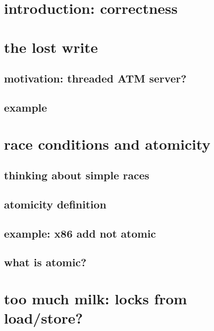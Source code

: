 
\section{introduction: correctness}



\section{the lost write}

\subsection{motivation: threaded ATM server?}


\subsection{example}


\section{race conditions and atomicity}
\subsection{thinking about simple races} 


\subsection{atomicity definition}



\subsection{example: x86 add not atomic}



\subsection{what is atomic?}



\section{too much milk: locks from load/store?}

